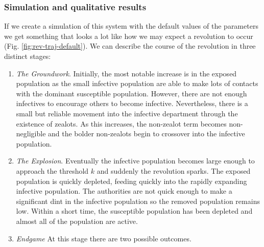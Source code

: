 \subsubsection{Simulation and qualitative results}
If we create a simulation of this system with the default values of the parameters we get something that looks a lot like how we may expect a revolution to occur (Fig. \ref{fig:rev-traj-default}). We can describe the course of the revolution in three distinct stages:
\begin{enumerate}
	\item\label{groundwork} \textit{The Groundwork}. Initially, the most notable increase is in the exposed population as the small infective population are able to make lots of contacts with the dominant susceptible population. However, there are not enough infectives to encourage others to become infective. Nevertheless, there is a small but reliable movement into the infective department through the existence of zealots. As this increases, the non-zealot term becomes non-negligible and the bolder non-zealots begin to crossover into the infective population. 
	\item\label{explosion} \textit{The Explosion}. Eventually the infective population becomes large enough to approach the threshold $k$ and suddenly the revolution sparks. The exposed population is quickly depleted, feeding quickly into the rapidly expanding infective population. The authorities are not quick enough to make a significant dint in the infective population so the removed population remains low. Within a short time, the susceptible population has been depleted and almost all of the population are active.
	\item\label{easy-pickings} \textit{Endgame} At this stage there are two possible outcomes.
\end{enumerate}
